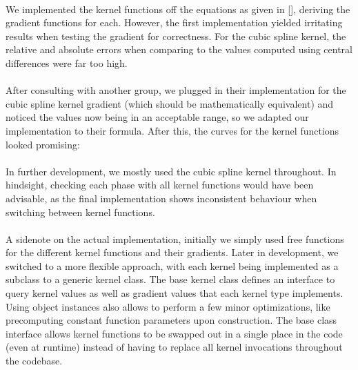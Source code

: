 \documentclass{ACGSeminar}
\begin{document}
\\
We implemented the kernel functions off the equations as given in [\cite{Liu}], deriving the gradient functions for each. However, the first implementation yielded irritating results when testing the gradient for correctness. For the cubic spline kernel, the relative and absolute errors when comparing to the values computed using central differences were far too high. \\
\\
After consulting with another group, we plugged in their implementation for the cubic spline kernel gradient (which should be mathematically equivalent) and noticed the values now being in an acceptable range, so we adapted our implementation to their formula. After this, the curves for the kernel functions looked promising:\\
\\
In further development, we mostly used the cubic spline kernel throughout. In hindsight, checking each phase with all kernel functions would have been advisable, as the final implementation shows inconsistent behaviour when switching between kernel functions.\\
\\
A sidenote on the actual implementation, initially we simply used free functions for the different kernel functions and their gradients. Later in development, we switched to a more flexible approach, with each kernel being implemented as a subclass to a generic kernel class. The base kernel class defines an interface to query kernel values as well as gradient values that each kernel type implements. Using object instances also allows to perform a few minor optimizations, like precomputing constant function parameters upon construction. The base class interface allows kernel functions to be swapped out in a single place in the code (even at runtime) instead of having to replace all kernel invocations throughout the codebase.\\
\\
\end{document}
